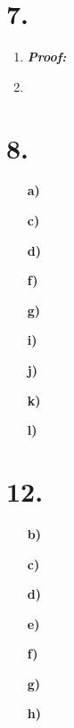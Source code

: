 \documentclass[12pt,letterpaper]{article}
\begin{document}
\section*{7.}
\begin{enumerate}[label= \textbf{\alph*)}]
	\item \textbf{\textit{Proof:}}
	\item 
\end{enumerate}

\section*{8.}
\begin{enumerate}[label= \textbf{\alph*)}]
	\item[\textbf{a)}]
	\item[\textbf{c)}]
	\item[\textbf{d)}]
	\item[\textbf{f)}]
	\item[\textbf{g)}]
	\item[\textbf{i)}]
	\item[\textbf{j)}]
	\item[\textbf{k)}]
	\item[\textbf{l)}]        
\end{enumerate}

\section*{12.}
\begin{enumerate}[label= \textbf{\alph*)}]
	\item[\textbf{b)}]
	\item[\textbf{c)}]
	\item[\textbf{d)}]
	\item[\textbf{e)}]
	\item[\textbf{f)}]
	\item[\textbf{g)}]
	\item[\textbf{h)}] 
\end{enumerate}
\end{document}
